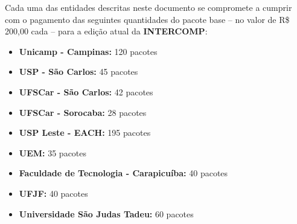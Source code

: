 \begin{article}
	\label{art:cotas}
	Cada uma das entidades descritas neste documento se compromete a cumprir com o pagamento das seguintes quantidades do pacote base -- no valor de R\$ 200,00 cada -- para a edição atual da \textbf{INTERCOMP}:
	\begin{itemize}[noitemsep]
		\item \textbf{Unicamp - Campinas:} 120 pacotes
		\item \textbf{USP - São Carlos:} 45 pacotes
		\item \textbf{UFSCar - São Carlos:} 42 pacotes
		\item \textbf{UFSCar - Sorocaba:} 28 pacotes
		\item \textbf{USP Leste - EACH:} 195 pacotes
		\item \textbf{UEM:} 35 pacotes
		\item \textbf{Faculdade de Tecnologia - Carapicuíba:} 40 pacotes
		\item \textbf{UFJF:} 40 pacotes
		\item \textbf{Universidade São Judas Tadeu:} 60 pacotes
	\end{itemize}
\end{article}
